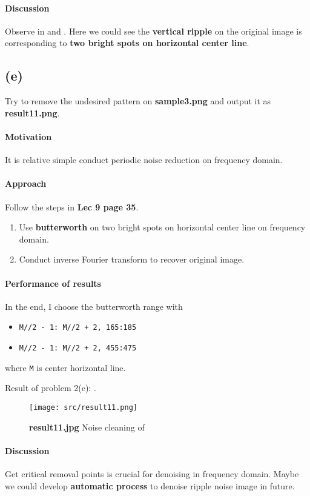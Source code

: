 \paragraph{Discussion}
Observe in  and .
Here we could see the \textbf{vertical ripple} on the original image is corresponding to \textbf{two bright spots on horizontal center line}.

\subsection{(e)}\label{2_e}
Try to remove the undesired pattern on \textbf{sample3.png} and output it as \textbf{result11.png}.

\paragraph{Motivation}
It is relative simple conduct periodic noise reduction on frequency domain.

\paragraph{Approach}
Follow the steps in \textbf{Lec 9 page 35}.
\begin{enumerate}
    \item Use \textbf{butterworth} on two bright spots on horizontal center line on frequency domain.
    \item Conduct inverse Fourier transform to recover original image.
\end{enumerate}

\paragraph{Performance of results}
In the end, I choose the butterworth range with
\begin{itemize}
    \item \texttt{M//2 - 1: M//2 + 2, 165:185}
    \item \texttt{M//2 - 1: M//2 + 2, 455:475}
\end{itemize}
where \texttt{M} is center horizontal line.

Result of problem 2(e): .
\begin{figure}
    \centering
    \texttt{[image: src/result11.png]}
    \caption{\textbf{result11.jpg} Noise cleaning of }
    \label{result11}
\end{figure}

\paragraph{Discussion}
Get critical removal points is crucial for denoising in frequency domain.
Maybe we could develop \textbf{automatic process} to denoise ripple noise image in future.

